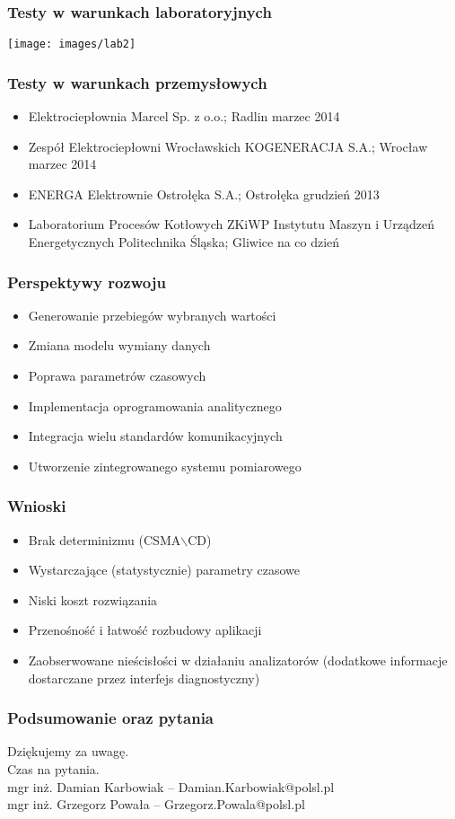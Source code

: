 \documentclass[ucs]{beamer}
\begin{document}
\begin{frame}
\frametitle{Testy w warunkach laboratoryjnych}
\begin{center}
\texttt{[image: images/lab2]}
\end{center}
\end{frame}

\begin{frame}
\frametitle{Testy w warunkach przemysłowych}
\begin{itemize}
\setlength{\itemsep}{5pt}
\setlength{\parskip}{5pt}
\setlength{\parsep}{5pt}
\item Elektrociepłownia Marcel Sp. z o.o.; Radlin marzec 2014
\item Zespół Elektrociepłowni Wrocławskich KOGENERACJA S.A.; Wrocław marzec 2014
\item ENERGA Elektrownie Ostrołęka S.A.; Ostrołęka grudzień 2013
\item Laboratorium Procesów Kotłowych ZKiWP Instytutu Maszyn i Urządzeń Energetycznych Politechnika Śląska; Gliwice na co dzień
\end{itemize}
\end{frame}

\begin{frame}
\frametitle{Perspektywy rozwoju}
\begin{itemize}
\setlength{\itemsep}{5pt}
\setlength{\parskip}{5pt}
\setlength{\parsep}{5pt}
\item Generowanie przebiegów wybranych wartości
\item Zmiana modelu wymiany danych
\item Poprawa parametrów czasowych
\item Implementacja oprogramowania analitycznego
\item Integracja wielu standardów komunikacyjnych
\item Utworzenie zintegrowanego systemu pomiarowego
\end{itemize}
\end{frame}

\begin{frame}
\frametitle{Wnioski}
\begin{itemize}
\setlength{\itemsep}{5pt}
\setlength{\parskip}{5pt}
\setlength{\parsep}{5pt}
\item Brak determinizmu (CSMA$\backslash$CD)
\item Wystarczające (statystycznie) parametry czasowe
\item Niski koszt rozwiązania
\item Przenośność i łatwość rozbudowy aplikacji
\item Zaobserwowane nieścisłości w działaniu analizatorów (dodatkowe informacje dostarczane przez interfejs diagnostyczny)
\end{itemize}
\end{frame}

\begin{frame}
\frametitle{Podsumowanie oraz pytania}
Dziękujemy za uwagę.
\\\vspace{2cm}
Czas na pytania.
\\\vspace{2cm}
mgr inż. Damian Karbowiak -- Damian.Karbowiak@polsl.pl
\\\vspace{2mm}
mgr inż. Grzegorz Powała  -- Grzegorz.Powala@polsl.pl
\end{frame}
\end{document}
